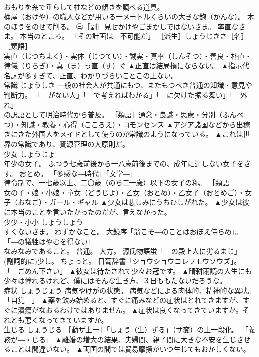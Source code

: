 \documentclass[8pt]{extreport}
\begin{document}
\begin{CJK}{UTF8}{min}
\\	おもりを糸で垂らして柱などの傾きを調べる道具。 
\\	桶屋（おけや）の職人などが用いる一メートルくらいの大きな鉋（かんな）。 木のほうをのせて削る。 ㊂［副］見せかけやごまかしではないさま。 率直なさま。 本当のところ。 「その計画は―不可能だ」 ［派生］しょうじきさ［名］ ［類語］ 
\\	実直（じつちよく）・実体（じつてい）・誠実・真率（しんそつ）・善良・朴直・律儀（りちぎ）・真（ま）っ直（す）ぐ	▲正直は結局損にならない。 ▲指示代名詞が多すぎて、正直、わかりづらいことこの上ない。
\\	常識	じょうしき	一般の社会人が共通にもつ、またもつべき普通の知識・意見や判断力。 「―がない人」「―で考えればわかる」「―に欠けた振る舞い」「―外れ」 
\\	の訳語として明治時代から普及。 ［類語］通念・良識・思慮・分別（ふんべつ）・知識・教養・心得（こころえ）・コモンセンス	▲アジア諸国などから出稼ぎにきた外国人をメイドとして使うのが常識のようになっている。 ▲これは世界の常識であり、資源管理の大原則だ。
\\	少女	しょうじょ	
\\	年少の女子。 ふつう七歳前後から一八歳前後までの、成年に達しない女子をさす。 おとめ。 「多感な―時代」「文学―」 
\\	律令制で、一七歳以上、二〇歳（のち二一歳）以下の女子の称。 ［類語］
\\	女の子・娘・小娘・童女（どうじよ）・乙女（おとめ）・乙女子（おとめご）・女子（おなご）・ガール・ギャル	▲少女は悲しみにうちひしがれた。 ▲少女は彼に本当のことを言いたかったのだが、言えなかった。
\\	少少・小小	しょうしょう	
\\	すくないさま。 わずかなこと。 大鏡序「翁こそ―のことはおぼえ侍らめ」。 「―の犠牲はやむを得ない」 
\\	なみなみであること。 普通。 大方。 源氏物語蛍「―の殿上人に劣るまじ」 
\\	(副詞的に)少し。 ちょっと。 日葡辞書「ショウショウコレヲモウソウズ」。 「―ごめん下さい」	▲彼女は待たされて少々お冠です。 ▲晴耕雨読の人生にも少々は憧れるけれど、僕にはそんな生き方、３日ももたないだろうな。
\\	症状	しょうじょう	病気やけがの状態。 病気などによる肉体的、精神的な異状。 「自覚―」	▲薬を飲み始めると、すぐに痛みなどの症状はとれてきますが、すぐに潰瘍がなおるわけではありません。 ▲症状は良くなってきていますか。それとも悪くなってきていますか。
\\	生じる	しょうじる	［動ザ上一］「しょう（生）ずる」（サ変）の上一段化。 「義務が―・じる」	▲離婚の増大の結果、夫婦間、親子間に大きな不安を生じさせることは間違いない。 ▲両国の間では貿易摩擦がいつ生じてもおかしくない。

\end{CJK}
\end{document}
